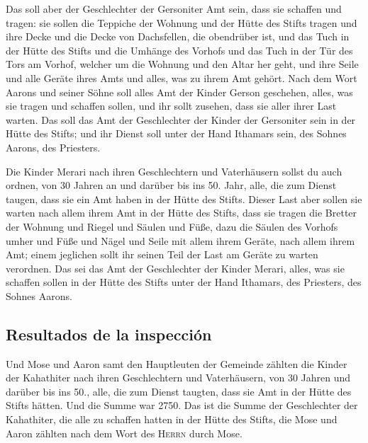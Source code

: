  Das soll aber der Geschlechter der Gersoniter Amt sein,
dass sie schaffen und tragen:  sie sollen die Teppiche
der Wohnung und der Hütte des Stifts tragen und ihre Decke und die Decke
von Dachsfellen, die obendrüber ist, und das Tuch in der Hütte des
Stifts  und die Umhänge des Vorhofs und das Tuch in der
Tür des Tors am Vorhof, welcher um die Wohnung und den Altar her geht,
und ihre Seile und alle Geräte ihres Amts und alles, was zu ihrem Amt
gehört.  Nach dem Wort Aarons und seiner Söhne soll alles
Amt der Kinder Gerson geschehen, alles, was sie tragen und schaffen
sollen, und ihr sollt zusehen, dass sie aller ihrer Last warten.
 Das soll das Amt der Geschlechter der Kinder der
Gersoniter sein in der Hütte des Stifts; und ihr Dienst soll unter der
Hand Ithamars sein, des Sohnes Aarons, des Priesters.

 Die Kinder Merari nach ihren Geschlechtern und
Vaterhäusern sollst du auch ordnen,  von 30 Jahren an und
darüber bis ins 50. Jahr, alle, die zum Dienst taugen, dass sie ein Amt
haben in der Hütte des Stifts.  Dieser Last aber sollen
sie warten nach allem ihrem Amt in der Hütte des Stifts, dass sie tragen
die Bretter der Wohnung und Riegel und Säulen und Füße, 
dazu die Säulen des Vorhofs umher und Füße und Nägel und Seile mit allem
ihrem Geräte, nach allem ihrem Amt; einem jeglichen sollt ihr seinen
Teil der Last am Geräte zu warten verordnen.  Das sei das
Amt der Geschlechter der Kinder Merari, alles, was sie schaffen sollen
in der Hütte des Stifts unter der Hand Ithamars, des Priesters, des
Sohnes Aarons.

\hypertarget{resultados-de-la-inspecciuxf3n}{%
\subsection{Resultados de la
inspección}\label{resultados-de-la-inspecciuxf3n}}

 Und Mose und Aaron samt den Hauptleuten der Gemeinde
zählten die Kinder der Kahathiter nach ihren Geschlechtern und
Vaterhäusern,  von 30 Jahren und darüber bis ins 50.,
alle, die zum Dienst taugten, dass sie Amt in der Hütte des Stifts
hätten.  Und die Summe war 2750.  Das ist
die Summe der Geschlechter der Kahathiter, die alle zu schaffen hatten
in der Hütte des Stifts, die Mose und Aaron zählten nach dem Wort des
\textsc{Herrn} durch Mose.

